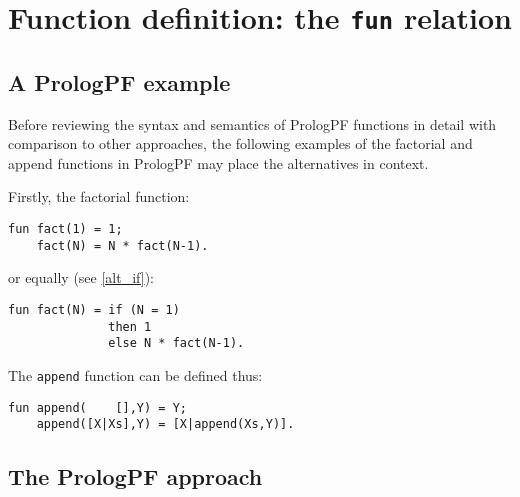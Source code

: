 \section{Function definition: the \texttt{fun} relation} %

\label{definition}



\subsection{A PrologPF example}

Before reviewing the syntax and semantics of PrologPF functions in detail with
comparison to other approaches, the following examples of the factorial and
append functions in PrologPF may place the alternatives in context.

Firstly, the factorial function:
\begin{verbatim}
fun fact(1) = 1;
    fact(N) = N * fact(N-1).
\end{verbatim}
or equally (see \ref{alt_if}):
\begin{verbatim}
fun fact(N) = if (N = 1)
              then 1
              else N * fact(N-1).
\end{verbatim}
The \texttt{append} function can be defined thus:
\begin{verbatim}
fun append(    [],Y) = Y;
    append([X|Xs],Y) = [X|append(Xs,Y)].
\end{verbatim}

\subsection{The PrologPF approach}

